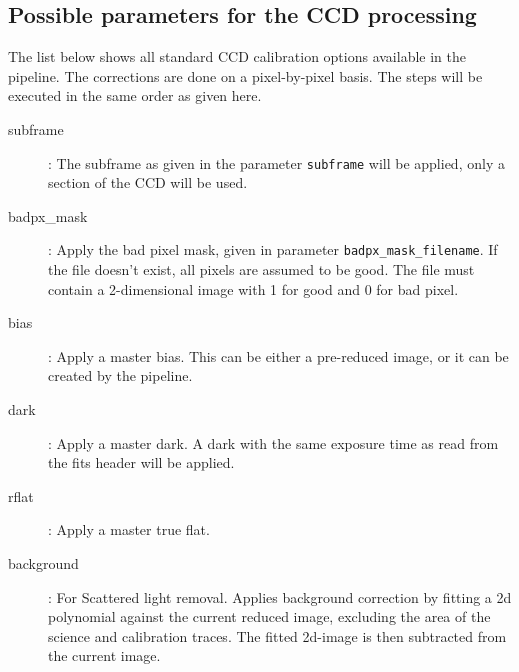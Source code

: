 \documentclass[10pt,a4paper]{article}
\begin{document}
\subsection{Possible parameters for the CCD processing}
\label{Section:parameters_CCD_proc}
\noindent The list below shows all standard CCD calibration options available in the pipeline. The corrections are done on a pixel-by-pixel basis. The steps will be executed in the same order as given here.
\begin{description}
  \item[subframe] : The subframe as given in the parameter \verb|subframe| will be applied, only a section of the CCD will be used.
  \item[badpx\_mask] : Apply the bad pixel mask, given in parameter \verb|badpx_mask_filename|. If the file doesn't exist, all pixels are assumed to be good. The file must contain a 2-dimensional image with 1 for good and 0 for bad pixel.
  \item[bias] : Apply a master bias. This can be either a pre-reduced image, or it can be created by the pipeline. %
  \item[dark] : Apply a master dark. A dark with the same exposure time as read from the fits header will be applied. %
  \item[rflat] : Apply a master true flat. %
  \item[background] : For Scattered light removal. Applies background correction by fitting a 2d polynomial against the current reduced image, excluding the area of the science and calibration traces. The fitted 2d-image is then subtracted from the current image.
\end{description}
\end{document}
